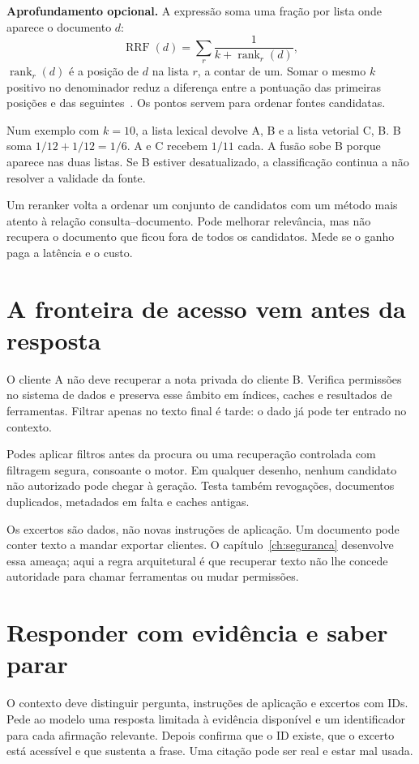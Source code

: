 \textbf{Aprofundamento opcional.} A expressão soma uma fração por lista onde aparece o documento $d$:
\[
\operatorname{RRF}(d)=\sum_{r}\frac{1}{k+\operatorname{rank}_{r}(d)},
\]
$\operatorname{rank}_r(d)$ é a posição de $d$ na lista $r$, a contar de um. Somar o mesmo $k$ positivo no denominador reduz a diferença entre a pontuação das primeiras posições e das seguintes~\citep{cormack2009}. Os pontos servem para ordenar fontes candidatas.

Num exemplo com $k=10$, a lista lexical devolve A, B e a lista vetorial C, B. B soma $1/12+1/12=1/6$. A e C recebem $1/11$ cada. A fusão sobe B porque aparece nas duas listas. Se B estiver desatualizado, a classificação continua a não resolver a validade da fonte.

Um reranker volta a ordenar um conjunto de candidatos com um método mais atento à relação consulta--documento. Pode melhorar relevância, mas não recupera o documento que ficou fora de todos os candidatos. Mede se o ganho paga a latência e o custo.

\section{A fronteira de acesso vem antes da resposta}
O cliente A não deve recuperar a nota privada do cliente B. Verifica permissões no sistema de dados e preserva esse âmbito em índices, caches e resultados de ferramentas. Filtrar apenas no texto final é tarde: o dado já pode ter entrado no contexto.

Podes aplicar filtros antes da procura ou uma recuperação controlada com filtragem segura, consoante o motor. Em qualquer desenho, nenhum candidato não autorizado pode chegar à geração. Testa também revogações, documentos duplicados, metadados em falta e caches antigas.

Os excertos são dados, não novas instruções de aplicação. Um documento pode conter texto a mandar exportar clientes. O capítulo~\ref{ch:seguranca} desenvolve essa ameaça; aqui a regra arquitetural é que recuperar texto não lhe concede autoridade para chamar ferramentas ou mudar permissões.

\section{Responder com evidência e saber parar}
O contexto deve distinguir pergunta, instruções de aplicação e excertos com IDs. Pede ao modelo uma resposta limitada à evidência disponível e um identificador para cada afirmação relevante. Depois confirma que o ID existe, que o excerto está acessível e que sustenta a frase. Uma citação pode ser real e estar mal usada.

